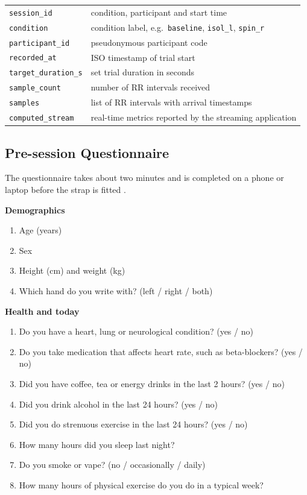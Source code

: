\begin{tabular}{@{}ll@{}}
\texttt{session\_id} & condition, participant and start time \\
\texttt{condition} & condition label, e.g.\ \texttt{baseline}, \texttt{isol\_l}, \texttt{spin\_r} \\
\texttt{participant\_id} & pseudonymous participant code \\
\texttt{recorded\_at} & ISO timestamp of trial start \\
\texttt{target\_duration\_s} & set trial duration in seconds \\
\texttt{sample\_count} & number of RR intervals received \\
\texttt{samples} & list of RR intervals with arrival timestamps \\
\texttt{computed\_stream} & real-time metrics reported by the streaming application \\
\end{tabular}

\subsection{Pre-session Questionnaire}
\label{sec:app-questionnaire}

The questionnaire takes about two minutes and is completed on a phone or laptop before the strap is fitted .

\textbf{Demographics}
\begin{enumerate}[leftmargin=1.5em]
\item Age (years)
\item Sex
\item Height (cm) and weight (kg)
\item Which hand do you write with? (left / right / both)
\end{enumerate}

\textbf{Health and today}
\begin{enumerate}[leftmargin=1.5em,resume]
\item Do you have a heart, lung or neurological condition? (yes / no)
\item Do you take medication that affects heart rate, such as beta-blockers? (yes / no)
\item Did you have coffee, tea or energy drinks in the last 2 hours? (yes / no)
\item Did you drink alcohol in the last 24 hours? (yes / no)
\item Did you do strenuous exercise in the last 24 hours? (yes / no)
\item How many hours did you sleep last night?
\item Do you smoke or vape? (no / occasionally / daily)
\item How many hours of physical exercise do you do in a typical week?
\end{enumerate}

